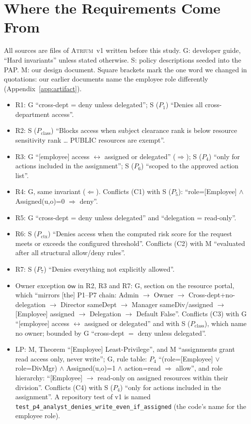 \documentclass[sigconf,review,anonymous]{acmart}
\newcommand{\sysname}{\textsc{Atrium}\xspace}
\newcommand{\sysname}{\textsc{OpenZTAC}\xspace}
\newcommand{\Pc}{P_{\mathrm{class}}}
\newcommand{\Px}{P_{\mathrm{ctx}}}
\newcommand{\ow}{\mathsf{ow}}
\begin{document}



\appendix
\section{Where the Requirements Come From}
\label{app:prov}
All sources are files of \sysname~v1 written before this study. G: developer guide, ``Hard invariants'' unless
stated otherwise.
S: policy descriptions seeded into the PAP. M: our design document. Square brackets mark the one word we changed
in quotations: our earlier documents name the employee role differently (Appendix~\ref{app:artifact}).
\begin{itemize}
\item R1: G ``cross-dept = deny unless delegated''; S ($P_1$) ``Denies all cross-department access''.
\item R2: S ($\Pc$) ``Blocks access when subject clearance rank is below resource sensitivity rank \ldots{} PUBLIC
resources are exempt''.
\item R3: G ``[employee] access $\leftrightarrow$ assigned or delegated'' ($\Rightarrow$); S ($P_4$) ``only for actions
included in the assignment''; S ($P_6$) ``scoped to the approved action list''.
\item R4: G, same invariant ($\Leftarrow$). Conflicts (C1) with S ($P_5$):
``role=[Employee] $\wedge$ Assigned(u,o)=0 $\Rightarrow$\allowbreak{} deny''.
\item R5: G ``cross-dept = deny unless delegated'' and ``delegation = read-only''.
\item R6: S ($\Px$) ``Denies access when the computed risk score for the request meets or exceeds the configured
threshold''. Conflicts (C2) with M ``evaluated after all structural allow/deny rules''.
\item R7: S ($P_7$) ``Denies everything not explicitly allowed''.
\item Owner exception $\ow$ in R2, R3 and R7: G, section on the resource portal, which ``mirrors [the] P1--P7
chain: Admin $\to$ Owner $\to$ Cross-dept+no-delegation $\to$ Director sameDept $\to$ Manager sameDiv/assigned
$\to$ [Employee] assigned $\to$ Delegation $\to$ Default False''. Conflicts (C3) with G ``[employee] access
$\leftrightarrow$ assigned or delegated'' and with S ($\Pc$), which name no owner; bounded by G ``cross-dept $=$
deny unless delegated''.
\item LP: M, Theorem ``[Employee] Least-Privilege'', and M ``assignments grant read access only, never write'';
G, rule table: $P_4$ ``(role=[Employee] $\vee$ role=DivMgr) $\wedge$ Assigned(u,o)=1 $\wedge$ action=read
$\Rightarrow$ allow'', and role hierarchy: ``[Employee] $\to$ read-only on assigned resources within their division''. Conflicts (C4)
with S ($P_4$) ``only for actions included in the assignment''. A repository test of v1 is named
\texttt{test\_p4\_analyst\_denies\_write\_even\_if\_assigned} (the code's name for the employee role).
\end{itemize}
\end{document}
